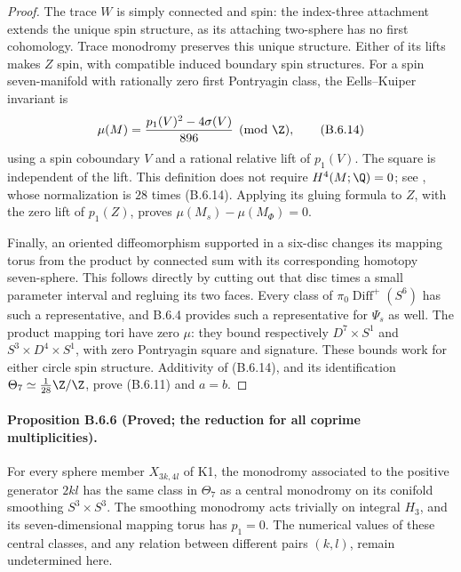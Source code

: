 \begin{proof}
The trace $W$ is simply connected and spin: the index-three
attachment extends the unique spin structure, as its attaching
two-sphere has no first cohomology. Trace monodromy preserves
this unique structure. Either of its lifts makes $Z$ spin,
with compatible induced boundary spin structures. For a spin
seven-manifold with rationally zero first Pontryagin class,
the Eells--Kuiper invariant is
\[
 \mu(M)=\frac{p_1(V)^2-4\sigma(V)}{896}\pmod{\Z},
 \tag{B.6.14}
\]
using a spin coboundary $V$ and a rational relative lift of
$p_1(V)$. The square is independent of the lift. This definition
does not require $H^4(M;\Q)=0$; see
\cite[Section 1.4, equations (2)--(3)]{mapsCrowleyNordstrom19},
whose normalization is $28$ times (B.6.14). Applying its gluing
formula to $Z$, with the zero lift of $p_1(Z)$, proves
$\mu(M_s)-\mu(M_\Phi)=0$.

Finally, an oriented diffeomorphism supported in a six-disc
changes its mapping torus from the product by connected sum
with its corresponding homotopy seven-sphere. This follows
directly by cutting out that disc times a small parameter
interval and regluing its two faces. Every class of
$\pi_0\operatorname{Diff}^+(S^6)$ has such a representative,
and B.6.4 provides such a representative for $\Psi_s$ as well.
The product mapping tori have zero $\mu$: they bound respectively
$D^7\times S^1$ and $S^3\times D^4\times S^1$, with zero
Pontryagin square and signature. These bounds work for either
circle spin structure. Additivity of (B.6.14), and its
identification $\Theta_7\simeq\frac1{28}\Z/\Z$, prove
(B.6.11) and $a=b$.
\end{proof}

\paragraph{Proposition B.6.6 (Proved; the reduction for all coprime multiplicities).}
For every sphere member $X_{3k,4l}$ of K1, the monodromy associated
to the positive generator $2kl$ has the same class in $\Theta_7$
as a central monodromy on its conifold smoothing $S^3\times S^3$.
The smoothing monodromy acts trivially on integral $H_3$, and
its seven-dimensional mapping torus has $p_1=0$. The numerical
values of these central classes, and any relation between
different pairs $(k,l)$, remain undetermined here.


